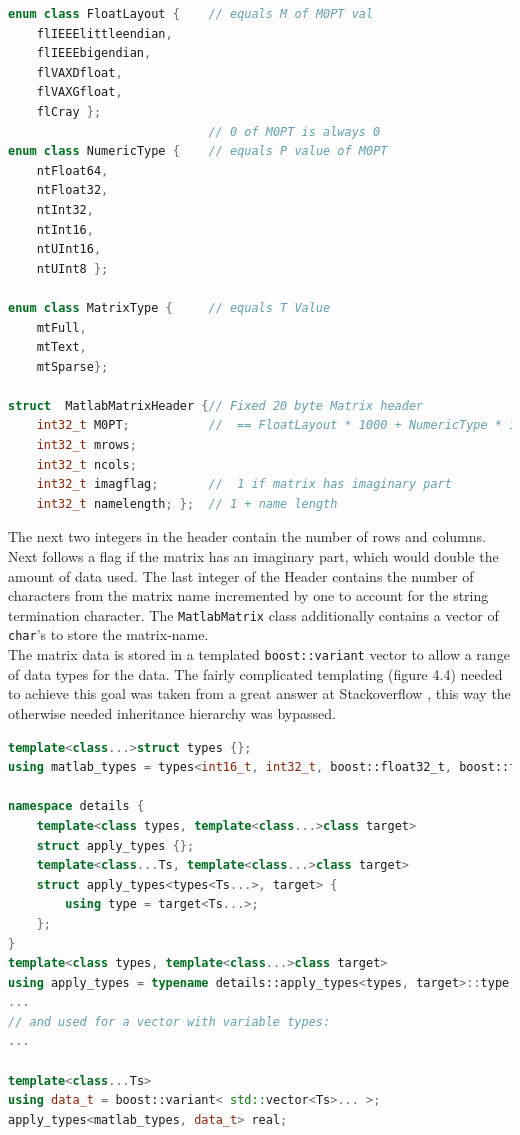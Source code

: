 \begin{lstlisting}[language=C++, caption=A code snippet showing the used enums and structs in the MATLAB header.]
enum class FloatLayout {  	// equals M of M0PT val
    flIEEElittleendian,
    flIEEEbigendian,
    flVAXDfloat,
    flVAXGfloat,
    flCray };
							// 0 of M0PT is always 0
enum class NumericType { 	// equals P value of M0PT
    ntFloat64,
    ntFloat32,
    ntInt32,
    ntInt16,
    ntUInt16,
    ntUInt8 };

enum class MatrixType {  	// equals T Value
    mtFull,
    mtText,
    mtSparse};

struct  MatlabMatrixHeader {// Fixed 20 byte Matrix header
    int32_t M0PT;  			//  == FloatLayout * 1000 + NumericType * 10 + MatrixType
    int32_t mrows;
    int32_t ncols;
    int32_t imagflag;   	//  1 if matrix has imaginary part
    int32_t namelength; }; 	// 1 + name length
\end{lstlisting}

The next two integers in the header contain the number of rows and columns. Next follows a flag if the matrix has an imaginary part, which would double the amount of data used. The last integer of the Header contains the number of characters from the matrix name incremented by one to account for the string termination character.
The \texttt{MatlabMatrix} class additionally contains a vector of \texttt{char}'s to store the matrix-name.\\
The matrix data is stored in a templated \texttt{boost::variant} vector to allow a range of data types for the data. The fairly complicated templating (figure 4.4) needed to achieve this goal was taken from  a great answer at Stackoverflow \cite{stackof}, this way the otherwise needed inheritance hierarchy was bypassed. 
\begin{lstlisting}[language=C++, caption=A code snippet showing the templating to allow various types in a Boost variant.]
template<class...>struct types {};
using matlab_types = types<int16_t, int32_t, boost::float32_t, boost::float64_t, uint8_t, uint16_t>;

namespace details {
    template<class types, template<class...>class target>
    struct apply_types {};
    template<class...Ts, template<class...>class target>
    struct apply_types<types<Ts...>, target> {
        using type = target<Ts...>;
    };
}
template<class types, template<class...>class target>
using apply_types = typename details::apply_types<types, target>::type;
...
// and used for a vector with variable types:
...

template<class...Ts>
using data_t = boost::variant< std::vector<Ts>... >;
apply_types<matlab_types, data_t> real;
\end{lstlisting}
